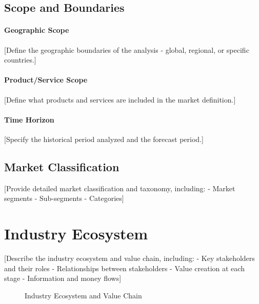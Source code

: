 \documentclass[11pt,letterpaper]{report}
\begin{document}
\subsection{Scope and Boundaries}

\paragraph{Geographic Scope}
[Define the geographic boundaries of the analysis - global, regional, or specific countries.]

\paragraph{Product/Service Scope}
[Define what products and services are included in the market definition.]

\paragraph{Time Horizon}
[Specify the historical period analyzed and the forecast period.]

\subsection{Market Classification}

[Provide detailed market classification and taxonomy, including:
- Market segments
- Sub-segments
- Categories]

\section{Industry Ecosystem}


[Describe the industry ecosystem and value chain, including:
- Key stakeholders and their roles
- Relationships between stakeholders
- Value creation at each stage
- Information and money flows]

\begin{figure}[htbp]
\centering
\caption{Industry Ecosystem and Value Chain}
\label{fig:ecosystem}
\end{figure}
\end{document}
